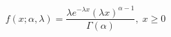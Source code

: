\documentclass[preview]{standalone}
\begin{document}
\begin{align*}
f(x;\alpha,\lambda)=\dfrac{\lambda e^{-\lambda x}(\lambda x)^{\alpha-1}}{\Gamma(\alpha)},\;x\ge0
\end{align*}
\end{document}
